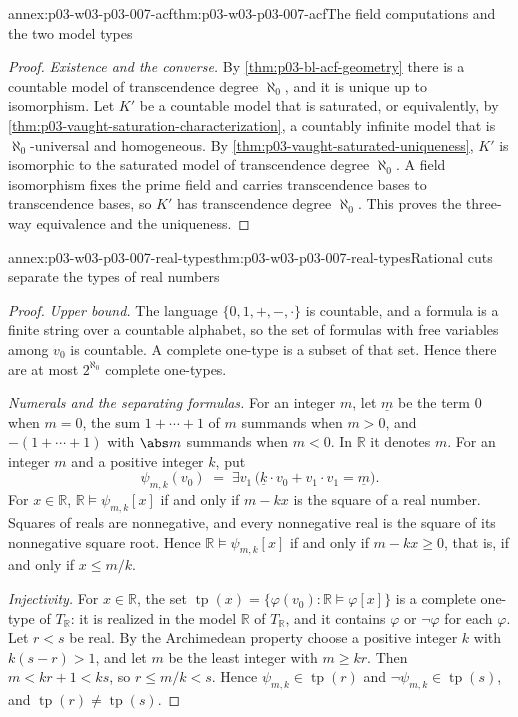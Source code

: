 \begin{annexitem}{annex:p03-w03-p03-007-acf}{thm:p03-w03-p03-007-acf}{The field computations and the two model types}
\begin{proof}
\emph{Existence and the converse.} By \cref{thm:p03-bl-acf-geometry} there
is a countable model of transcendence degree \(\aleph_0\), and it is unique
up to isomorphism. Let \(K'\) be a countable model that is saturated, or
equivalently, by \cref{thm:p03-vaught-saturation-characterization}, a
countably infinite model that is \(\aleph_0\)-universal and homogeneous. By
\cref{thm:p03-vaught-saturated-uniqueness}, \(K'\) is isomorphic to the
saturated model of transcendence degree \(\aleph_0\). A field isomorphism
fixes the prime field and carries transcendence bases to transcendence
bases, so \(K'\) has transcendence degree \(\aleph_0\). This proves the
three-way equivalence and the uniqueness.
\end{proof}
\end{annexitem}

\begin{annexitem}{annex:p03-w03-p03-007-real-types}{thm:p03-w03-p03-007-real-types}{Rational cuts separate the types of real numbers}
\begin{proof}
\emph{Upper bound.} The language \(\{0,1,+,-,\cdot\}\) is countable, and a
formula is a finite string over a countable alphabet, so the set of
formulas with free variables among \(v_0\) is countable. A complete one-type
is a subset of that set. Hence there are at most \(2^{\aleph_0}\) complete
one-types.

\emph{Numerals and the separating formulas.} For an integer \(m\), let
\(\underline m\) be the term \(0\) when \(m=0\), the sum
\(1+\cdots+1\) of \(m\) summands when \(m>0\), and
\(-(1+\cdots+1)\) with \(\abs m\) summands when \(m<0\). In \(\mathbb R\) it
denotes \(m\). For an integer \(m\) and a positive integer \(k\), put
\[
 \psi_{m,k}(v_0)\;=\;\exists v_1\,
   \bigl(\underline k\cdot v_0+v_1\cdot v_1=\underline m\bigr).
\]
For \(x\in\mathbb R\), \(\mathbb R\models\psi_{m,k}[x]\) if and only if
\(m-kx\) is the square of a real number. Squares of reals are nonnegative,
and every nonnegative real is the square of its nonnegative square root.
Hence \(\mathbb R\models\psi_{m,k}[x]\) if and only if \(m-kx\ge0\), that
is, if and only if \(x\le m/k\).

\emph{Injectivity.} For \(x\in\mathbb R\), the set
\(\operatorname{tp}(x)=\{\varphi(v_0):\mathbb R\models\varphi[x]\}\) is a
complete one-type of \(T_{\mathbb R}\): it is realized in the model
\(\mathbb R\) of \(T_{\mathbb R}\), and it contains \(\varphi\) or
\(\neg\varphi\) for each \(\varphi\). Let \(r<s\) be real. By the
Archimedean property choose a positive integer \(k\) with \(k(s-r)>1\), and
let \(m\) be the least integer with \(m\ge kr\). Then \(m<kr+1<ks\), so
\(r\le m/k<s\). Hence \(\psi_{m,k}\in\operatorname{tp}(r)\) and
\(\neg\psi_{m,k}\in\operatorname{tp}(s)\), and
\(\operatorname{tp}(r)\neq\operatorname{tp}(s)\).


\end{proof}
\end{annexitem}
